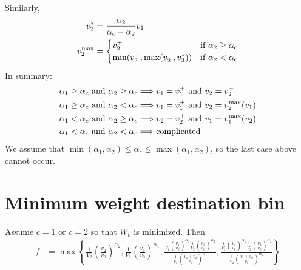 \documentclass{article}
\begin{document}
Similarly,
\begin{align}
  v_2^* &= \frac{\alpha_2}{\alpha_{\rm c} - \alpha_2} v_1 \\
  v_2^{\rm max} &= \begin{cases}
    v_2^+ & \text{if } \alpha_2 \ge \alpha_{\rm c} \\
    \min(v_2^+, \max(v_2^-, v_2^*)) & \text{if } \alpha_2 < \alpha_{\rm c}
    \end{cases}
\end{align}
In summary:
\begin{align}
  \alpha_1 \ge \alpha_c \text{ and } \alpha_2 \ge \alpha_c
  &\Longrightarrow v_1 = v_1^+ \text{ and } v_2 = v_2^+ \\
  \alpha_1 \ge \alpha_c \text{ and } \alpha_2 < \alpha_c
  &\Longrightarrow v_1 = v_1^+ \text{ and } v_2 = v_2^{\rm max}(v_1) \\
  \alpha_1 < \alpha_c \text{ and } \alpha_2 \ge \alpha_c
  &\Longrightarrow v_2 = v_2^+ \text{ and } v_1 = v_1^{\rm max}(v_2)  \\
  \alpha_1 < \alpha_c \text{ and } \alpha_2 < \alpha_c
  &\Longrightarrow \text{complicated}
\end{align}
We assume that $\min(\alpha_1,\alpha_2) \le \alpha_c \le
\max(\alpha_1,\alpha_2)$, so the last case above cannot occur.

\section{Minimum weight destination bin}

Assume $c = 1$ or $c = 2$ so that $W_c$ is minimized. Then
\begin{align}
  f &= \max\left\{
    \frac{1}{V_2} \left(\frac{v_2}{v_0}\right)^{\alpha_2},
    \frac{1}{V_1} \left(\frac{v_1}{v_0}\right)^{\alpha_1},
    \frac{\frac{1}{V_1} \left(\frac{v_1}{v_0}\right)^{\alpha_1}
      \frac{1}{V_2} \left(\frac{v_2}{v_0}\right)^{\alpha_2}}{
      \frac{1}{V_1} \left(\frac{v_1 + v_2}{v_0}\right)^{\alpha_1}},
    \frac{\frac{1}{V_1} \left(\frac{v_1}{v_0}\right)^{\alpha_1}
      \frac{1}{V_2} \left(\frac{v_2}{v_0}\right)^{\alpha_2}}{
      \frac{1}{V_2} \left(\frac{v_1 + v_2}{v_0}\right)^{\alpha_2}}
  \right\}
\end{align}
\end{document}

